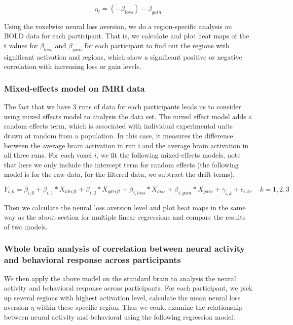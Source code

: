 \documentclass[11pt]{article}
\begin{document}
\begin{equation}
\eta_i = (-\beta_{loss}) - \beta_{gain}
\end{equation}

Using the voxelwise neural loss aversion, we do a region-specific analysis on 
BOLD data for each participant. That is, we calculate and plot heat maps of the t values
for $\beta_{loss}$ and $\beta_{gain}$ for each participant to find out the 
regions with significant activation and regions, which show a significant 
positive or negative correlation with increasing loss or gain levels.

\subsubsection{Mixed-effects model on fMRI data}

The fact that we have 3 runs of data for each participants leads us to consider using mixed effects model to analysis the data set. The mixed effect model adds a random effects term, which is associated with individual experimental units drawn at random from a population. In this case, it measures the difference between the average brain activation in run i and the 
average brain activation in all three runs. For each voxel $i$, we fit the following mixed-effects models, note that here we only include the intercept term for random effects (the following model is for the raw data, for the filtered data, we subtract the drift terms).

\begin{equation}
Y_{i, k} = \beta_{i, 0} + \beta_{i,1} *X_{ldrift} + \beta_{i, 2} * X_{qdrift} +  \beta_{i, loss} *X_{loss} + \beta_{i, gain} * X_{gain}  + \gamma _{i, k} + \epsilon_{i, k}, \quad k =1, 2, 3
\end{equation}

Then we calculate the neural loss aversion level and plot heat maps in the same way as the about section for multiple linear regressions and compare the results of two models. 

\subsubsection{Whole brain analysis of correlation between 
neural activity and behavioral response across participants}

We then apply the above model on the standard brain to analysis the neural 
activity and behavioral response across participants. For each participant, 
we pick up several regions with highest activation level, calculate the mean 
neural loss aversion $\bar{\eta}$ within these specific region. Thus we could 
examine the relationship between neural activity and behavioral using the 
following regression model:
\end{document}
